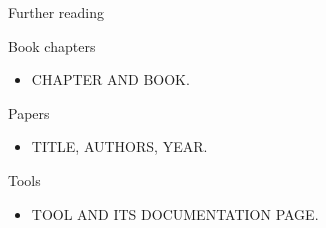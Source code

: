 \begin{frame}{Further reading}
  \begin{block}{Book chapters}
    \begin{itemize}
      \item CHAPTER AND BOOK.
    \end{itemize}
  \end{block}
  \begin{block}{Papers}
    \begin{itemize}
      \item TITLE, AUTHORS, YEAR.
    \end{itemize}
  \end{block}
  \begin{block}{Tools}
    \begin{itemize}
      \item TOOL AND ITS DOCUMENTATION PAGE.
    \end{itemize}
  \end{block}
\end{frame}

